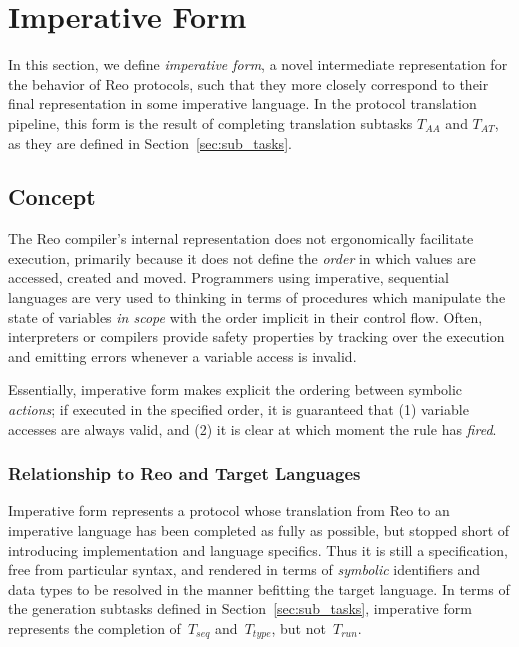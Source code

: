 \section{Imperative Form}
\label{sec:imperative_form_sec}
In this section, we define \textit{imperative form}, a novel intermediate representation for the behavior of Reo protocols, such that they more closely correspond to their final representation in some imperative language. In the protocol translation pipeline, this form is the result of completing translation subtasks $T_{AA}$ and $T_{AT}$, as they are defined in Section~\ref{sec:sub_tasks}.

\subsection{Concept}
The Reo compiler's internal representation does not ergonomically facilitate execution, primarily because it does not define the \textit{order} in which values are accessed, created and moved. Programmers using imperative, sequential languages are very used to thinking in terms of procedures which manipulate the state of variables \textit{in scope} with the order implicit in their control flow. Often, interpreters or compilers provide safety properties by tracking over the execution and emitting errors whenever a variable access is invalid.

Essentially, imperative form makes explicit the ordering between symbolic \textit{actions}; if executed in the specified order, it is guaranteed that (1) variable accesses are always valid, and (2) it is clear at which moment the rule has \textit{fired}.

\subsubsection{Relationship to Reo and Target Languages}
Imperative form represents a protocol whose translation from Reo to an imperative language has been completed as fully as possible, but stopped short of introducing implementation and language specifics. Thus it is still a specification, free from particular syntax, and rendered in terms of \textit{symbolic} identifiers and data types to be resolved in the manner befitting the target language. In terms of the generation subtasks defined in Section~\ref{sec:sub_tasks}, imperative form represents the completion of~$T_{seq}$ and~$T_{type}$, but not~$T_{run}$.

